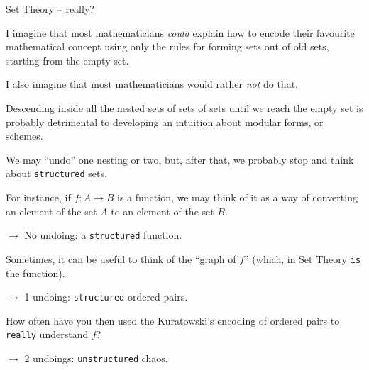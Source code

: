 \documentclass{beamer}
\begin{document}
\begin{frame}[fragile]{Set Theory -- really?}

I imagine that most mathematicians {\emph{could}} explain how to encode their favourite mathematical concept using only the rules for forming sets out of old sets, starting from the empty set.
\bigskip

I also imagine that most mathematicians would rather {\emph{not}} do that.
\bigskip

Descending inside all the nested sets of sets of sets until we reach the empty set is probably detrimental to developing an intuition about modular forms, or schemes.
\end{frame}

\begin{frame}[fragile]

We may ``undo'' one nesting or two, but, after that, we probably stop and think about {\color{purple}\verb`structured`} sets.
\bigskip

For instance, if $f \colon A \longrightarrow B$ is a function, we may think of it as a way of converting an element of the set $A$ to an element of the set $B$.

$\to$ No undoing: a {\color{purple}\verb`structured`} function.
\bigskip

Sometimes, it can be useful to think of the ``graph of $f$'' (which, in Set Theory {\color{purple}\verb`is`} the function).

$\to$ 1 undoing: {\color{purple}\verb`structured`} ordered pairs.
\bigskip

How often have you then used the Kuratowski's encoding of ordered pairs to {\color{purple}\verb`really`} understand $f$?

$\to$ 2 undoings: {\color{purple}\verb`unstructured`} chaos.
\end{frame}
\end{document}
